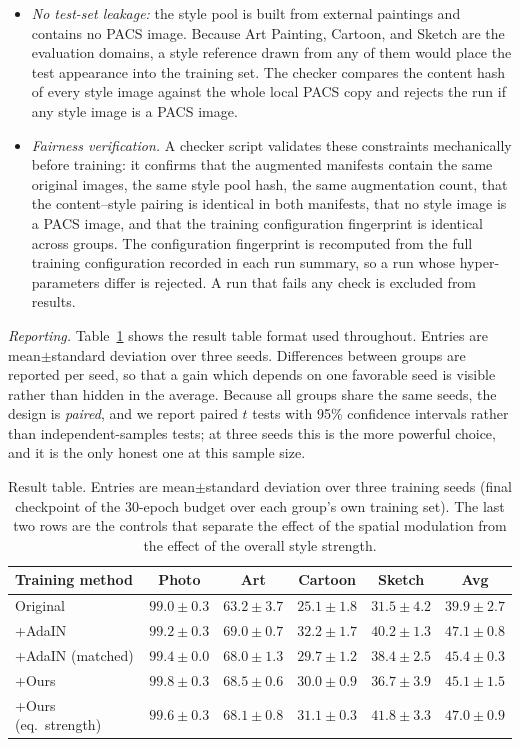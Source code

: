 \begin{itemize}
\item \textit{No test-set leakage:} the style pool is built from external paintings and contains no PACS image. Because Art Painting, Cartoon, and Sketch are the evaluation domains, a style reference drawn from any of them would place the test appearance into the training set. The checker compares the content hash of every style image against the whole local PACS copy and rejects the run if any style image is a PACS image.
\item \textit{Fairness verification.} A checker script validates these constraints mechanically before training: it confirms that the augmented manifests contain the same original images, the same style pool hash, the same augmentation count, that the content--style pairing is identical in both manifests, that no style image is a PACS image, and that the training configuration fingerprint is identical across groups. The configuration fingerprint is recomputed from the full training configuration recorded in each run summary, so a run whose hyper-parameters differ is rejected. A run that fails any check is excluded from results.
\end{itemize}

\textit{Reporting.} Table~\ref{tab:results} shows the result table format used throughout. Entries are mean$\pm$standard deviation over three seeds. Differences between groups are reported per seed, so that a gain which depends on one favorable seed is visible rather than hidden in the average. Because all groups share the same seeds, the design is \emph{paired}, and we report paired $t$ tests with 95\% confidence intervals rather than independent-samples tests; at three seeds this is the more powerful choice, and it is the only honest one at this sample size.

\begin{table}[t]
\caption{Result table. Entries are mean$\pm$standard deviation over three training seeds (final checkpoint of the 30-epoch budget over each group's own training set). The last two rows are the controls that separate the effect of the spatial modulation from the effect of the overall style strength.}
\label{tab:results}
\centering
\scriptsize
\setlength{\tabcolsep}{2.0pt}
\begin{tabular}{@{}lccccc@{}}
\toprule
Training method & Photo & Art & Cartoon & Sketch & Avg \\
\midrule
Original & $99.0\pm0.3$ & $63.2\pm3.7$ & $25.1\pm1.8$ & $31.5\pm4.2$ & $39.9\pm2.7$ \\
+AdaIN   & $99.2\pm0.3$ & $69.0\pm0.7$ & $32.2\pm1.7$ & $40.2\pm1.3$ & $\mathbf{47.1\pm0.8}$ \\
+AdaIN (matched) & $99.4\pm0.0$ & $68.0\pm1.3$ & $29.7\pm1.2$ & $38.4\pm2.5$ & $45.4\pm0.3$ \\
+Ours    & $99.8\pm0.3$ & $68.5\pm0.6$ & $30.0\pm0.9$ & $36.7\pm3.9$ & $45.1\pm1.5$ \\
+Ours (eq.\ strength) & $99.6\pm0.3$ & $68.1\pm0.8$ & $31.1\pm0.3$ & $41.8\pm3.3$ & $\mathbf{47.0\pm0.9}$ \\
\bottomrule
\end{tabular}
\end{table}

